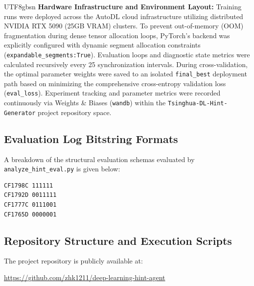 \documentclass{article}
\begin{document}
\begin{CJK*}{UTF8}{gbsn}
\textbf{Hardware Infrastructure and Environment Layout:} 
Training runs were deployed across the AutoDL cloud infrastructure utilizing distributed NVIDIA RTX 5090 (25GB VRAM) clusters. To prevent out-of-memory (OOM) fragmentation during dense tensor allocation loops, PyTorch's backend was explicitly configured with dynamic segment allocation constraints (\texttt{expandable\_segments:True}). Evaluation loops and diagnostic state metrics were calculated recursively every 25 synchronization intervals. During cross-validation, the optimal parameter weights were saved to an isolated \texttt{final\_best} deployment path based on minimizing the comprehensive cross-entropy validation loss (\texttt{eval\_loss}). Experiment tracking and parameter metrics were recorded continuously via Weights \& Biases (\texttt{wandb}) within the \texttt{Tsinghua-DL-Hint-Generator} project repository space.

\subsection{Evaluation Log Bitstring Formats}
A breakdown of the structural evaluation schemas evaluated by \texttt{analyze\_hint\_eval.py} is given below:
\begin{verbatim}
CF1798C 111111
CF1792D 0011111
CF1777C 0111001
CF1765D 0000001
\end{verbatim}


\subsection{Repository Structure and Execution Scripts}


The project repository is publicly available at:
\begin{center}
\url{https://github.com/zhk1211/deep-learning-hint-agent}
\end{center}



\end{CJK*}
\end{document}
